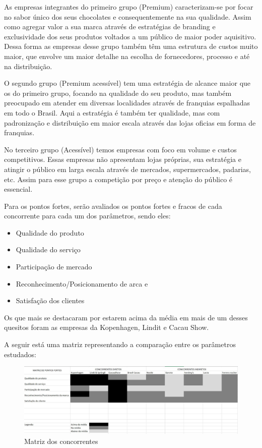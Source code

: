 \documentclass[
	12pt,				%
	openright,			%
	oneside,			%
	a4paper,			%
	english,			%
	french,				%
	spanish,			%
	brazil				%
	]{abntex2}
\begin{document}
As empresas integrantes do primeiro grupo (Premium) caracterizam-se por focar no sabor único dos seus chocolates e consequentemente na sua qualidade. Assim como agregar valor a sua marca através de estratégias de branding e exclusividade dos seus produtos voltados a um público de maior poder aquisitivo. Dessa forma as empresas desse grupo também têm uma estrutura de custos muito maior, que envolve um maior detalhe na escolha de fornecedores, processo e até na distribuição.

O segundo grupo (Premium acessível) tem uma estratégia de alcance maior que os do primeiro grupo, focando na qualidade do seu produto, mas também preocupado em atender em diversas localidades através de franquias espalhadas em todo o Brasil. Aqui a estratégia é também ter qualidade, mas com padronização e distribuição em maior escala através das lojas oficias em forma de franquias.

No terceiro grupo (Acessível) temos empresas com foco em volume e custos competitivos. Essas empresas não apresentam lojas próprias, sua estratégia e atingir o público em larga escala através de mercados, supermercados, padarias, etc. Assim para esse grupo a competição por preço e atenção do público é essencial.

Para os pontos fortes, serão avaliados os pontos fortes e fracos de cada concorrente para cada um dos parâmetros, sendo eles:
\begin{itemize}
\item Qualidade do produto
\item Qualidade do serviço
\item Participação de mercado
\item Reconhecimento/Posicionamento de arca e
\item Satisfação dos clientes
\end{itemize}
Os que mais se destacaram por estarem acima da média em mais de um desses quesitos foram as empresas da Kopenhagen, Lindit e Cacau Show.

A seguir está uma matriz representando a comparação entre os parâmetros estudados:

\begin{figure}[H]
\begin{center}
\caption{Matriz dos concorrentes}
\includegraphics[scale=0.3]{concorrentes2.jpeg} 
\end{center}
\end{figure}
\end{document}
